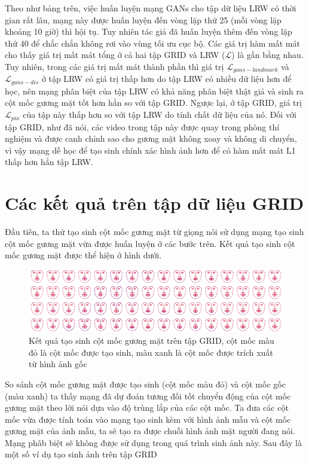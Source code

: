 Theo như bảng trên, việc huấn luyện mạng GANs cho tập dữ liệu LRW có thời gian rất lâu, mạng này được huấn luyện đến vòng lặp thứ 25 (mỗi vòng lặp khoảng 10 giờ) thì hội tụ. Tuy nhiên tác giả đã huấn luyện thêm đến vòng lặp thứ 40 để chắc chắn không rơi vào vùng tối ưu cục bộ. Các giá trị hàm mất mát cho thấy giá trị mất mát tổng ở cả hai tập GRID và LRW ($\mathcal{L}$) là gần bằng nhau. Tuy nhiên, trong các giá trị mất mát thành phần thì giá trị $\mathcal{L}_{gans-landmark}$ và $\mathcal{L}_{gans-dis}$ ở tập LRW có giá trị thấp hơn do tập LRW có nhiều dữ liệu hơn để học, nên mạng phân biệt của tập LRW có khả năng phân biệt thật giả và sinh ra cột mốc gương mặt tốt hơn hẳn so với tập GRID. Ngược lại, ở tập GRID, giá trị $\mathcal{L}_{pix}$ của tập này thấp hơn so với tập LRW do tính chất dữ liệu của nó. Đối với tập GRID, như đã nói, các video trong tập này được quay trong phòng thí nghiệm và được canh chỉnh sao cho gương mặt không xoay và không di chuyển, vì vậy mạng dễ học để tạo sinh chính xác hình ảnh hơn để có hàm mất mát L1 thấp hơn hẳn tập LRW.


\section{Các kết quả trên tập dữ liệu GRID}

Đầu tiên, ta thử tạo sinh cột mốc gương mặt từ giọng nói sử dụng mạng tạo sinh cột mốc gương mặt vừa được huấn luyện ở các bước trên. Kết quả tạo sinh cột mốc gương mặt được thể hiện ở hình dưới.

\begin{figure}[H]
    \centering
    \includegraphics[width=15cm]{./content/materials/grid_examples-landmark.png}
    \caption{Kết quả tạo sinh cột mốc gương mặt trên tập GRID, cột mốc màu đỏ là cột mốc được tạo sinh, màu xanh là cột mốc được trích xuất từ hình ảnh gốc}
\end{figure}

So sánh cột mốc gương mặt được tạo sinh (cột mốc màu đỏ) và cột mốc gốc (màu xanh) ta thấy mạng đã dự đoán tương đối tốt chuyển động của cột mốc gương mặt theo lời nói dựa vào độ trùng lắp của các cột mốc. Ta đưa các cột mốc vừa được tính toán vào mạng tạo sinh kèm với hình ảnh mẫu và cột mốc gương mặt của ảnh mẫu, ta sẽ tạo ra được chuỗi hình ảnh mặt người đang nói. Mạng phâb biệt sẽ không được sử dụng trong quá trình sinh ảnh này. Sau đây là một số ví dụ tạo sinh ảnh trên tập GRID

